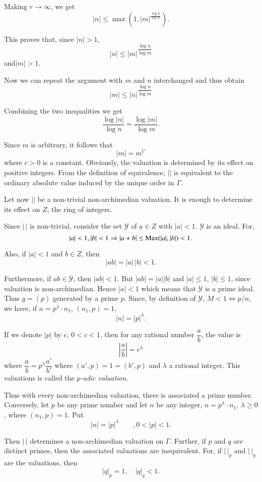 Making $r \to \infty$, we get
$$
|n| \le \max (1, |m|^{\frac{\log n}{\log m}}). 
$$

This proves that, since $|n| > 1$,
$$
|n| \le |m|^{\dfrac{\log n}{\log m}}
$$
and\pageoriginale $|m| > 1$.

Now we can repeat the argument with $m$ and $n$ interchanged and thus
obtain 
$$
|m| \le |n|^{\dfrac{\log n}{\log m}}
$$
 
Combining the two inequalities we get
$$
\frac{\log |n|}{\log n} = \frac{\log |m|}{\log m}.
$$

Since $m$ is arbitrary, it follows that 
$$
|m| = m^C
$$
where $c > 0$ is a constant. Obviously, the valuation is determined by
its effect on positive integers. From the definition of equivalence,
$| |$ is equivalent to the ordinary absolute value induced by the
unique order in $\Gamma$. 

Let now $| |$ be a non-trivial non-archimedian valuation. It is enough
to determine its effect on $Z$, the ring of integers. 

Since $|\, |$ is non-trivial, consider the set $\mathscr{Y}$ of
$\underline{a} \in Z$ with $|a| < 1$. $\mathscr{Y}$ is an ideal. For, 
$$
|a| < 1, |b| < 1 \Rightarrow |a+b| \le \operatorname{Max} (|a|, |b|) < 1. 
$$

Also, if $|a| < 1$ and $b \in Z$, then
$$
|ab| = |a| \, |b| < 1 .
$$

Furthermore, if $ab \in \mathscr{Y}$, then $|ab| < 1$. But $|ab| = |a|
|b|$ and $|a| \le 1$, $|b| \le 1$, since valuation is
non-archimedian. Hence $|a| < 1$ which means that $\mathscr{Y}$ is a
prime ideal. Thus $g = (p)$ generated by a prime $p$. Since, by
definition of $\mathscr{Y}$, $M < 1 \Leftrightarrow p/n$, we have, if $n
= p^{\lambda} \cdot n_1$, $(n_1 , p) = 1$, 
$$
|n| = |p|^\lambda .
$$\pageoriginale

If we denote $|p|$ by $c$, $0 < c < 1$, then for any rational number
$\dfrac{a}{b}$, the value is  
$$
\left|\frac{a}{b} \right| = c^\lambda
$$
where $\dfrac{a}{b}= p^\lambda \dfrac{a'}{b'}$ where $(a', p) = 1 =
(b', p)$ and $\lambda$ a rational integer. This valuations is called
the \textit{$p$-adic valuation}. 

Thus with every non-archimedian valuation, there is associated a prime
number. Conversely, let $p$ be any prime number and let $n$ be any
integer, $n = p^\lambda \cdot  n_1$, $\lambda \ge 0$, where $(n_1, p)
= 1$.  
Put
$$
|n| = |p|^\lambda \qquad , 0 < |p| < 1 .
$$

Then $|\, |$ determines a non-archimedian valuation on
$\Gamma$. Further, if $p$ and $q$ are distinct primes, then the
associated valuations are inequivalent. For, if $|\, |_p$ and $| \, |_q$
are the valuations, then 
$$
|q|_p = 1 , \quad |q|_q < 1 .
$$

